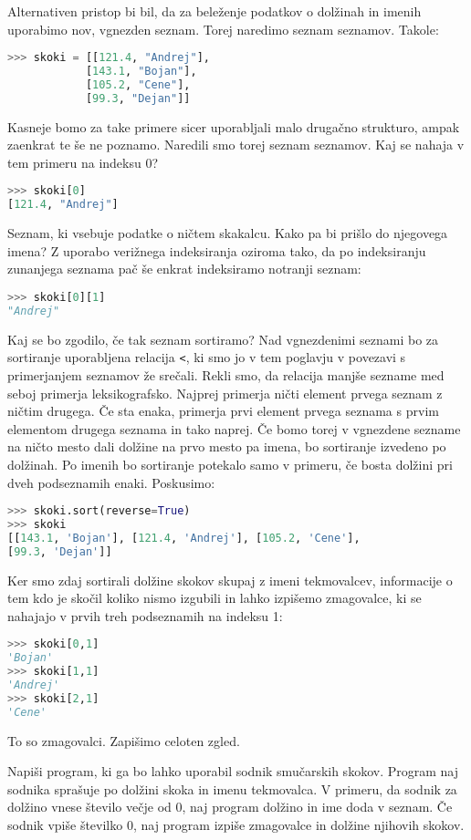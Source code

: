 Alternativen pristop bi bil, da za beleženje podatkov o dolžinah in imenih uporabimo nov, vgnezden seznam. Torej naredimo seznam seznamov. Takole:
\begin{lstlisting}[language=Python, showstringspaces=false]
>>> skoki = [[121.4, "Andrej"], 
            [143.1, "Bojan"], 
            [105.2, "Cene"], 
            [99.3, "Dejan"]]
\end{lstlisting}
Kasneje bomo za take primere sicer uporabljali malo drugačno strukturo, ampak zaenkrat te še ne poznamo. Naredili smo torej seznam seznamov. Kaj se nahaja v tem primeru na indeksu 0?
\begin{lstlisting}[language=Python, showstringspaces=false]
>>> skoki[0]
[121.4, "Andrej"]
\end{lstlisting}
Seznam, ki vsebuje podatke o ničtem skakalcu. Kako pa bi prišlo do njegovega imena? Z uporabo verižnega indeksiranja oziroma tako, da po indeksiranju zunanjega seznama pač še enkrat indeksiramo notranji seznam:
\begin{lstlisting}[language=Python, showstringspaces=false]
>>> skoki[0][1]
"Andrej"
\end{lstlisting}
Kaj se bo zgodilo, če tak seznam sortiramo? Nad vgnezdenimi seznami bo za sortiranje uporabljena relacija \texttt{<}, ki smo jo v tem poglavju v povezavi s primerjanjem seznamov že srečali. Rekli smo, da relacija manjše sezname med seboj primerja leksikografsko. Najprej primerja ničti element prvega seznam z ničtim drugega. Če sta enaka, primerja prvi element prvega seznama s prvim elementom drugega seznama in tako naprej. Če bomo torej v vgnezdene sezname na ničto mesto dali dolžine na prvo mesto pa imena, bo sortiranje izvedeno po dolžinah. Po imenih bo sortiranje potekalo samo v primeru, če bosta dolžini pri dveh podseznamih enaki. Poskusimo:
\begin{lstlisting}[language=Python, showstringspaces=false]
>>> skoki.sort(reverse=True)
>>> skoki
[[143.1, 'Bojan'], [121.4, 'Andrej'], [105.2, 'Cene'],
[99.3, 'Dejan']]
\end{lstlisting}
Ker smo zdaj sortirali dolžine skokov skupaj z imeni tekmovalcev, informacije o tem kdo je skočil koliko nismo izgubili in lahko izpišemo zmagovalce, ki se nahajajo v prvih treh podseznamih na indeksu 1:
\begin{lstlisting}[language=Python, showstringspaces=false]
>>> skoki[0,1]
'Bojan'
>>> skoki[1,1]
'Andrej'
>>> skoki[2,1]
'Cene'
\end{lstlisting}
To so zmagovalci. Zapišimo celoten zgled.
\begin{zgled}
Napiši program, ki ga bo lahko uporabil sodnik smučarskih skokov. Program naj sodnika sprašuje po dolžini skoka in imenu tekmovalca. V primeru, da sodnik za dolžino vnese število večje od 0, naj program dolžino in ime doda v seznam. Če sodnik vpiše številko 0, naj program izpiše zmagovalce in dolžine njihovih skokov.
\end{zgled}
